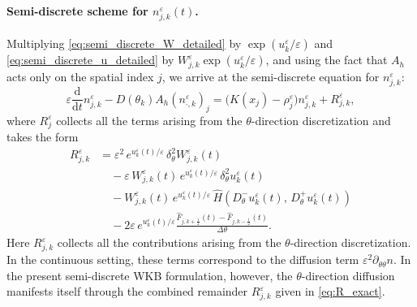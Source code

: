\documentclass[11pt, dina4, amsfont12]{article}
\begin{document}
\paragraph{Semi-discrete scheme for $n^\varepsilon_{j,k}(t)$.}
Multiplying \eqref{eq:semi_discrete_W_detailed} by
$\exp(u_k^\varepsilon/\varepsilon)$ and \eqref{eq:semi_discrete_u_detailed} by
$W_{j,k}^\varepsilon \exp(u_k^\varepsilon/\varepsilon)$, and using the fact that $A_h$ acts only on the spatial index $j$,
we arrive at the semi-discrete equation for $n_{j,k}^\varepsilon$:
\begin{equation}\label{eq:semi_discrete_n}
\varepsilon\frac{\mathrm d}{\mathrm dt} n_{j,k}^\varepsilon
-
D(\theta_k) A_h\!\left(n_{\cdot,k}^\varepsilon
\right)_j
=
\bigl(K(x_j)-\rho_j^\varepsilon\bigr) n_{j,k}^\varepsilon
+
R_{j,k}^\varepsilon ,
\end{equation}
where $R_j^\varepsilon$ collects all the terms arising from the
$\theta$-direction discretization and takes the form 
\begin{align}
R_{j,k}^\varepsilon
&=
\varepsilon^2\,
e^{u_k^\varepsilon(t)/\varepsilon}\,
\delta_\theta^2 W_{j,k}^\varepsilon(t)
\nonumber\\
&\quad
-\varepsilon\,
W_{j,k}^\varepsilon(t)\,
e^{u_k^\varepsilon(t)/\varepsilon}\,
\delta_\theta^2 u_k^\varepsilon(t)
\nonumber\\
&\quad
-
W_{j,k}^\varepsilon(t)\,
e^{u_k^\varepsilon(t)/\varepsilon}\,
\widehat{H}
\!\left(
D_\theta^- u_k^\varepsilon(t),\,
D_\theta^+ u_k^\varepsilon(t)
\right)
\nonumber\\
&\quad
-2\varepsilon\,
e^{u_k^\varepsilon(t)/\varepsilon}
\frac{
\widehat F_{j,k+\frac12}(t)
-
\widehat F_{j,k-\frac12}(t)
}{\Delta\theta}.
\label{eq:R_exact}
\end{align}
Here $R_{j,k}^\varepsilon$ collects all the contributions arising from the
$\theta$-direction discretization. In the continuous setting, these terms
correspond to the diffusion term $\varepsilon^2 \partial_{\theta\theta} n$.
In the present semi-discrete WKB formulation, however, the $\theta$-direction
diffusion manifests itself through the combined remainder
$R_{j,k}^\varepsilon$ given in \eqref{eq:R_exact}.
\end{document}
